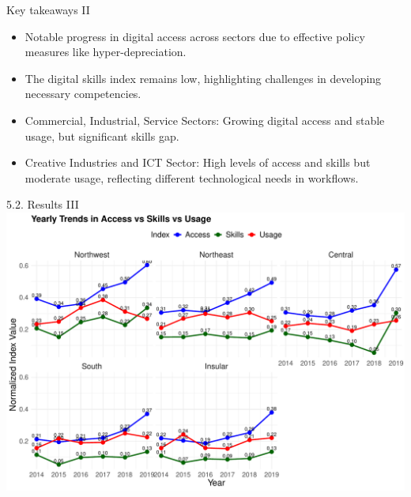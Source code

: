 \documentclass[
  ignorenonframetext,
]{beamer}
\begin{document}
\begin{frame}{Key takeaways II}
\label{key-takeaways-ii}
\begin{itemize}
\item
  Notable progress in digital access across sectors due to effective
  policy measures like hyper-depreciation.
\item
  The digital skills index remains low, highlighting challenges in
  developing necessary competencies.
\item
  Commercial, Industrial, Service Sectors: Growing digital access and
  stable usage, but significant skills gap.
\item
  Creative Industries and ICT Sector: High levels of access and skills
  but moderate usage, reflecting different technological needs in
  workflows.
\end{itemize}
\end{frame}

\begin{frame}{5.2. Results III}
\label{results-iii}
\includegraphics{FactoAnalysisDigitalDivide_files/figure-beamer/yearTrendReg-1.pdf}
\end{frame}
\end{document}
